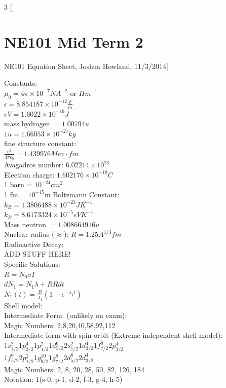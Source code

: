 \documentclass{article}
\begin{document}
\begin{multicols}{3}
[
\section{NE101 Mid Term 2}
NE101 Equation Sheet, Joshua Howland, 11/3/2014]

Constants:\\
$\mu_{0} = 4 \pi \times 10 ^{-7} NA^{-2}$ or $Hm^{-1} $\\
$\epsilon = 8.854187 \times 10 ^{-12} \frac{F}{m}$\\	
$eV = 1.6022\times 10 ^{-19} J$\\
mass hydrogen $ = 1.00794u  $\\
$1u = 1.66053 \times 10^{-27} kg $\\
fine structure constant: \\
$\frac{e^{2}}{4\pi\epsilon_{0}} = 1.439976 Mev \cdot fm$\\
Avagadros number: $6.02214\times 10^{23}$\\
Electron charge: $1.602176\times 10^{-19} C$\\
1 barn = $10^{-24} cm^{2}$\\
1 fm = $10^{-15}$m
Boltzmann Constant:\\
$k_{B} = 1.3806488\times 10^{-23}JK^{-1}$\\
$k_{B} = 8.6173324\times 10^{-5}eVK^{-1}$\\
Mass neutron $= 1.008664916 u$\\

Nuclear radius ($\approx$): $ R = 1.25A^{1/3} fm$\\

Radioactive Decay:\\
ADD STUFF HERE!\\
Specific Solutions:\\
$R = N_{0}\sigma I$\\
$dN_{1} = N_{1}\lambda + RRdt$\\
$N_{1}(t) = \frac{R}{\lambda_{1}}(1 - e^{-\lambda_{1}t})$\\


Shell model:\\
Intermediate Form: (unlikely on exam):\\
Magic Numbers: 2,8,20,40,58,92,112 \\

Intermediate form with spin orbit (Extreme independent shell model):\\
$1s_{1/2}^{2} 1p_{3/2}^{4} 1p_{1/2}^{2} 1d_{5/2}^{6} 2s_{1/2}^{2} 1d_{3/2}^{4} 1f_{7/2}^{8} 2p_{3/2}^{4} $\\
$1f_{5/2}^{6} 2p_{1/2}^{2} 1g_{9/2}^{10} 1g_{7/2}^{8} 2d_{5/2}^{6} 2d_{3/2}^{4}$\\
Magic Numbers: 2, 8, 20, 28, 50, 82, 126, 184\\
Notation: 1(s-0, p-1, d-2, f-3, g-4, h-5)\\


\end{multicols}
\end{document}
